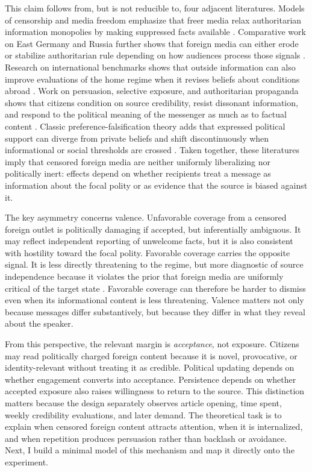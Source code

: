 \documentclass[12pt,american]{article}
\begin{document}
This claim follows from, but is not reducible to, four adjacent literatures. Models of censorship and media freedom emphasize that freer media relax authoritarian information monopolies by making suppressed facts available \citep{BesleyPrat2006,EgorovGurievSonin2009,gurievtreisman2019,chenyang2019}. Comparative work on East Germany and Russia further shows that foreign media can either erode or stabilize authoritarian rule depending on how audiences process those signals \citep{KernHainmueller2009,EnikolopovPetrovaZhuravskaya2011}. Research on international benchmarks shows that outside information can also improve evaluations of the home regime when it revises beliefs about conditions abroad \citep{KayserPeress2012,huang2015international}. Work on persuasion, selective exposure, and authoritarian propaganda shows that citizens condition on source credibility, resist dissonant information, and respond to the political meaning of the messenger as much as to factual content \citep{zaller1992,LupiaMcCubbins1998CUP,GentzkowShapiro2006,taberlodge2006,huang2015signal,mattinglyyao2022,panshaoxu2021,ValloneRossLepper1985,wangwestwood2024}. Classic preference-falsification theory adds that expressed political support can diverge from private beliefs and shift discontinuously when informational or social thresholds are crossed \citep{Kuran1991,Kuran1995}. Taken together, these literatures imply that censored foreign media are neither uniformly liberalizing nor politically inert: effects depend on whether recipients treat a message as information about the focal polity or as evidence that the source is biased against it.

The key asymmetry concerns valence. Unfavorable coverage from a censored foreign outlet is politically damaging if accepted, but inferentially ambiguous. It may reflect independent reporting of unwelcome facts, but it is also consistent with hostility toward the focal polity. Favorable coverage carries the opposite signal. It is less directly threatening to the regime, but more diagnostic of source independence because it violates the prior that foreign media are uniformly critical of the target state \citep{hovlandweiss1951,GentzkowShapiro2006}. Favorable coverage can therefore be harder to dismiss even when its informational content is less threatening. Valence matters not only because messages differ substantively, but because they differ in what they reveal about the speaker.

From this perspective, the relevant margin is \emph{acceptance}, not exposure. Citizens may read politically charged foreign content because it is novel, provocative, or identity-relevant without treating it as credible. Political updating depends on whether engagement converts into acceptance. Persistence depends on whether accepted exposure also raises willingness to return to the source. This distinction matters because the design separately observes article opening, time spent, weekly credibility evaluations, and later demand. The theoretical task is to explain when censored foreign content attracts attention, when it is internalized, and when repetition produces persuasion rather than backlash or avoidance. Next, I build a minimal model of this mechanism and map it directly onto the experiment.
	
\end{document}
